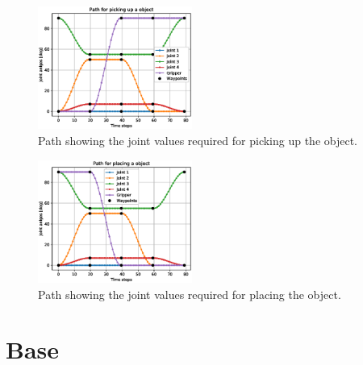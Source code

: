 \begin{figure}[H]
    \centering
    \includegraphics[width=0.45\textwidth]{chapters/img/pickup_path.eps}
    \caption{Path showing the joint values required for picking up the object.}
    \label{fig:pickup_path_interpolated}
\end{figure}


\begin{figure}[H]
    \centering
    \includegraphics[width=0.45\textwidth]{chapters/img/place_path.eps}
    \caption{Path showing the joint values required for placing the object.}
    \label{fig:place_path_interpolated}
\end{figure}






\section*{Base}


